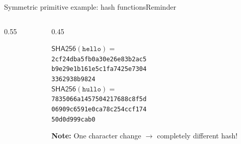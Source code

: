 \ifdefined\PRESENTATION\else\PassOptionsToClass{handout}{beamer}\fi\documentclass[aspectratio=169, lualatex]{beamer}
\begin{document}
\begin{frame}{Symmetric primitive example: hash functions}{Reminder}
	\begin{columns}[c]
		\begin{column}{0.55\textwidth}
		\end{column}
		\begin{column}{0.45\textwidth}
			\begin{tcolorbox}
				[colback=black!5!white,colframe=ciphergray] $\mathsf{SHA256}(\texttt{hello}) =$ \\ {\small\texttt{2cf24dba5fb0a30e26e83b2ac5}\\ \texttt{b9e29e1b161e5c1fa7425e7304}\\
					\texttt{3362938b9824}}\\[1em]
				$\mathsf{SHA256}(\texttt{hullo}) =$ \\ {\small\texttt{7835066a1457504217688c8f5d}\\
					\texttt{06909c6591e0ca78c254ccf174}\\ \texttt{50d0d999cab0}}
			\end{tcolorbox}
			\textcolor{cipherprimary}{\textbf{Note:} \small One character change $\rightarrow$
				completely different hash!}
		\end{column}
	\end{columns}
\end{frame}
\end{document}
